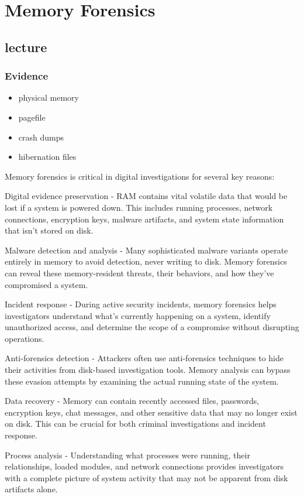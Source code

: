 
\chapter{Memory Forensics}
\newpage

\section{lecture}

\subsection{Evidence}
\begin{itemize}
  \item physical memory
  \item pagefile
  \item crash dumps
  \item hibernation files
\end{itemize}

Memory forensics is critical in digital investigations for several key reasons:

Digital evidence preservation - RAM contains vital volatile data that would be lost if a system is powered down. This includes running processes, network connections, encryption keys, malware artifacts, and system state information that isn't stored on disk.

Malware detection and analysis - Many sophisticated malware variants operate entirely in memory to avoid detection, never writing to disk. Memory forensics can reveal these memory-resident threats, their behaviors, and how they've compromised a system.

Incident response - During active security incidents, memory forensics helps investigators understand what's currently happening on a system, identify unauthorized access, and determine the scope of a compromise without disrupting operations.

Anti-forensics detection - Attackers often use anti-forensics techniques to hide their activities from disk-based investigation tools. Memory analysis can bypass these evasion attempts by examining the actual running state of the system.

Data recovery - Memory can contain recently accessed files, passwords, encryption keys, chat messages, and other sensitive data that may no longer exist on disk. This can be crucial for both criminal investigations and incident response.

Process analysis - Understanding what processes were running, their relationships, loaded modules, and network connections provides investigators with a complete picture of system activity that may not be apparent from disk artifacts alone.

